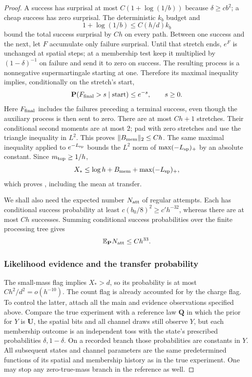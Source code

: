 \begin{proof}
A success has surprisal at most
$C(1+\log(1/b))$ because $\delta\ge cb^2$; a cheap success has
zero surprisal.  The deterministic $k_b$ budget and
\[
 1+\log(1/b)\le C(h/d)k_b
\]
bound the total success surprisal by $Ch$ on every path.
Between one success and the next, let $F$ accumulate only failure
surprisal.  Until that stretch ends, $e^F$ is unchanged at spatial
steps; at a membership test keep it multiplied by $(1-\delta)^{-1}$
on failure and send it to zero on success.  The resulting process is
a nonnegative supermartingale starting at one.  Therefore its
maximal inequality implies, conditionally on the stretch's start,
\[
 \mathbf P(F_{\rm final}>s\mid\text{start})\le e^{-s},
       \qquad s\ge0.
\]
Here $F_{\rm final}$ includes the failures preceding a terminal
success, even though the auxiliary process is then sent to zero.
There are at most $Ch+1$ stretches.  Their conditional second
moments are at most $2$; pad with zero stretches and use the triangle
inequality in $L^2$.  This proves $\|B_{\rm mem}\|_2\le Ch$.
The same maximal inequality applied to $e^{-L_{\rm sp}}$ bounds
the $L^2$ norm of $\max(-L_{\rm sp})_+$ by an absolute constant.
Since $m_{\rm top}\ge1/h$,
\[
 X_*\le\log h+B_{\rm mem}+\max(-L_{\rm sp})_+,
\]
which proves , including the mean at transfer.

We shall also need the expected number $N_{\rm att}$ of regular
attempts.  Each has conditional success probability at least
$c(b_0/8)^2\ge c'h^{-32}$, whereas there are at most $Ch$
successes.  Summing conditional success probabilities over the
finite processing tree gives
\begin{equation}
 \mathbb E_{\mathbf P}N_{\rm att}\le C h^{33}.
 \label{eq:06-attempt-count}
\end{equation}

\subsubsection*{Likelihood evidence and the transfer probability}
The small-mass flag implies $X_*>d$, so its probability is at most
$Ch^2/d^2=o(h^{-10})$.  The count flag is already accounted for by
the charge flag.  To control the latter, attach all the main and
evidence observations specified above.  Compare the true experiment
with a reference law $\mathbf Q$ in which the prior for $Y$ is
$\mathbf U$, the spatial bits and all channel draws still observe
$Y$, but each membership outcome is an independent toss with the
state's prescribed probabilities $\delta,1-\delta$.  On a recorded
branch those probabilities are constants in $Y$.  All subsequent
states and channel parameters are the same predetermined functions
of its spatial and membership history as in the true experiment.
One may stop any zero-true-mass branch in the reference as well.


\end{proof}
